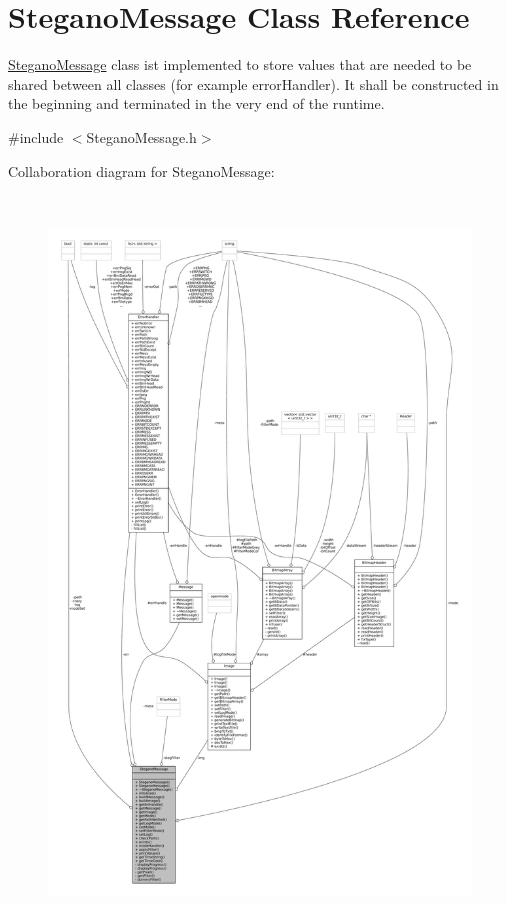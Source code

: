\hypertarget{classSteganoMessage}{}\section{Stegano\+Message Class Reference}
\label{classSteganoMessage}


\mbox{\hyperlink{classSteganoMessage}{Stegano\+Message}} class ist implemented to store values that are needed to be shared between all classes (for example error\+Handler). It shall be constructed in the beginning and terminated in the very end of the runtime.  




{\ttfamily \#include $<$Stegano\+Message.\+h$>$}



Collaboration diagram for Stegano\+Message\+:\nopagebreak
\begin{figure}[H]
\begin{center}
\leavevmode
\includegraphics[height=550pt]{classSteganoMessage__coll__graph}
\end{center}
\end{figure}
